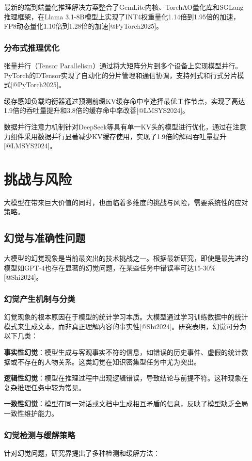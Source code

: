 \documentclass{article}
\begin{document}
最新的端到端量化推理解决方案整合了GemLite内核、TorchAO量化库和SGLang推理框架，在Llama 3.1-8B模型上实现了INT4权重量化1.14倍到1.95倍的加速，FP8动态量化1.10倍到1.28倍的加速[@PyTorch2025]。

\subsubsection{分布式推理优化}
张量并行（Tensor Parallelism）通过将大矩阵分片到多个设备上实现模型并行。PyTorch的DTensor实现了自动化的分片管理和通信协调，支持列式和行式分片模式[@PyTorch2025]。

缓存感知负载均衡器通过预测前缀KV缓存命中率选择最优工作节点，实现了高达1.9倍的吞吐量提升和3.8倍的缓存命中率改善[@LMSYS2024]。

数据并行注意力机制针对DeepSeek等具有单一KV头的模型进行优化，通过在注意力组件采用数据并行显著减少KV缓存使用，实现了1.9倍的解码吞吐量提升[@LMSYS2024]。

\section{挑战与风险}
大模型在带来巨大价值的同时，也面临着多维度的挑战与风险，需要系统性的应对策略。

\subsection{幻觉与准确性问题}
大模型的幻觉现象是当前最突出的技术挑战之一。根据最新研究，即使是最先进的模型如GPT-4也存在显著的幻觉问题，在某些任务中错误率可达15-30\%[@Shi2024]。

\subsubsection{幻觉产生机制与分类}
幻觉现象的根本原因在于模型的统计学习本质。大模型通过学习训练数据中的统计模式来生成文本，而非真正理解内容的事实性[@Shi2024]。研究表明，幻觉可分为以下几类：

\textbf{事实性幻觉}：模型生成与客观事实不符的信息，如错误的历史事件、虚假的统计数据或不存在的人物关系。这类幻觉在知识密集型任务中尤为突出。

\textbf{逻辑性幻觉}：模型在推理过程中出现逻辑错误，导致结论与前提不符。这种现象在复杂推理任务中较为常见。

\textbf{一致性幻觉}：模型在同一对话或文档中生成相互矛盾的信息，反映了模型缺乏全局一致性维护能力。

\subsubsection{幻觉检测与缓解策略}
针对幻觉问题，研究界提出了多种检测和缓解方法：
\end{document}
